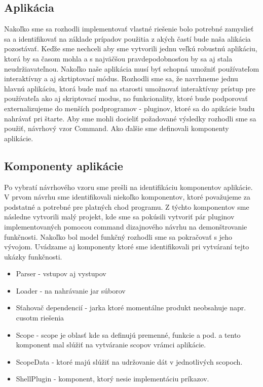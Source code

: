 \subsection{Aplikácia}
\indent Nakoľko sme sa rozhodli implementovať vlastné riešenie bolo potrebné zamyslieť sa a identifikovať na základe prípadov použitia z akých častí bude naša alikácia pozostávať. Keďže sme nechceli aby sme vytvorili jednu veľkú robustnú aplikáciu, ktorá by sa časom mohla a s najväčšou pravdepodobnosťou by sa  aj stala neudržiavateľnou. Nakoľko naše aplikácia musí byť schopná umožniť používateľom interaktívny a aj skrtiptovací módus. Rozhodli sme sa, že navrhneme jednu hlavnú aplikáciu, ktorá bude mať na starosti umožnovať interaktívny prístup pre používateľa ako aj skriptovací modus, no funkcionality, ktoré bude podporovať externalizujeme do menších podprogramov - pluginov, ktoré sa do apikácie budu nahrávať pri štarte. Aby sme mohli docieliť požadované výsledky rozhodli sme sa použiť, návrhový vzor Command. Ako ďalšie sme definovali komponenty aplikácie.

\subsection{Komponenty aplikácie}
\indent Po vybratí návrhového vzoru sme prešli na identifikáciu komponentov aplikácie. V prvom návrhu sme identifikovali niekoľko komponentov, ktoré považujeme za podstatné a potrebné pre platných chod programu. Z týchto komponentov sme následne vytvorili malý projekt, kde sme sa pokúsili vytvoriť pár pluginov implementovaných pomocou command dizajnového návrhu na demonštrovanie funkčnosti. Nakoľko bol model funkčný rozhodli sme sa pokračovať s jeho vývojom. Uvádzame aj komponenty ktoré sme identifikovali pri vytváraní tejto ukázky funkčnosti.
\begin{itemize}
	\item Parser - vstupov aj vystupov
	\item Loader - na nahrávanie  jar súborov
	\item Sťahovač dependencií - jarka ktoré momentálne produkt neobsahuje napr. cusotm riešenia
	\item Scope - scope je oblasť kde sa definujú premenné, funkcie a pod. a tento komponent mal slúžiť na vytváranie scopov vrámci aplikácie.
	\item ScopeData - ktoré majú slúžiť na udržovanie dát v jednotlivých scopoch.
	\item ShellPlugin - komponent, ktorý nesie implementáciu príkazov.
\end{itemize}

